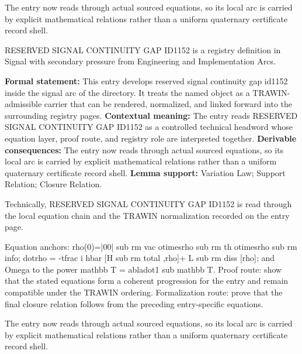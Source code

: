 The entry now reads through actual sourced equations, so its local arc is carried by explicit mathematical relations rather than a uniform quaternary certificate record shell.
\clearpage


\begingroup\small
{}
RESERVED SIGNAL CONTINUITY GAP ID1152 is a registry definition in Signal with secondary pressure from Engineering and Implementation Arcs.

\begingroup\footnotesize\setlength{\emergencystretch}{3em}\sloppy
\textbf{Formal statement:} This entry develops reserved signal continuity gap id1152 inside the signal arc of the directory. It treats the named object as a TRAWIN-admissible carrier that can be rendered, normalized, and linked forward into the surrounding registry pages. \textbf{Contextual meaning:} The entry reads RESERVED SIGNAL CONTINUITY GAP ID1152 as a controlled technical headword whose equation layer, proof route, and registry role are interpreted together. \textbf{Derivable consequences:} The entry now reads through actual sourced equations, so its local arc is carried by explicit mathematical relations rather than a uniform quaternary certificate record shell. \textbf{Lemma support:} Variation Law; Support Relation; Closure Relation.\par
\endgroup

Technically, RESERVED SIGNAL CONTINUITY GAP ID1152 is read through the local equation chain and the TRAWIN normalization recorded on the entry page.

Equation anchors: rho(0)=|00| sub rm vac otimesrho sub rm th otimesrho sub rm info; dotrho = -tfrac i hbar [H sub rm total ,rho]+ L sub rm diss [rho]; and Omega to the power mathbb T = abladot1 sub mathbb T. Proof route: show that the stated equations form a coherent progression for the entry and remain compatible under the TRAWIN ordering. Formalization route: prove that the final closure relation follows from the preceding entry-specific equations.

The entry now reads through actual sourced equations, so its local arc is carried by explicit mathematical relations rather than a uniform quaternary certificate record shell.
\endgroup

